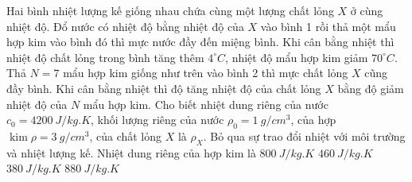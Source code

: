 \begin{vidu} 
	Hai bình nhiệt lượng kế giống nhau chứa cùng một lượng chất lỏng $X$ ở cùng nhiệt độ.
	Đổ nước có nhiệt độ bằng nhiệt độ của $X$ vào bình 1 rồi thả một mẩu hợp kim vào bình đó thì mực nước đầy đến miệng bình. Khi cân bằng nhiệt thì nhiệt độ chất lỏng trong bình tăng thêm $4^\circ C$, nhiệt độ mẩu hợp kim giảm $70^\circ C$. Thả $N=7$ mẩu hợp kim giống như trên vào bình 2 thì mực chất lỏng $X$ cũng đầy bình. Khi cân bằng nhiệt thì độ tăng nhiệt độ của chất lỏng $X$ bằng độ giảm nhiệt độ của $N$ mẩu hợp kim. Cho biết nhiệt dung riêng của nước $c_0=4200 \ J/kg . K$, khối lượng riêng của nước $\rho_0=1 \ g / cm^3$, của hợp $\operatorname{kim} \rho=3 \ g / cm^3$, của chất lỏng $X$ là $\rho_{X}$. Bỏ qua sự trao đổi nhiệt với môi trường và nhiệt lượng kế. Nhiệt dung riêng của hợp kim là 
	\choice
	{\True $800 \ J/kg . K$}
	{$460 \ J/kg . K$}
	{$380 \ J/kg . K$}
	{$880 \ J/kg . K$}
\end{vidu}
